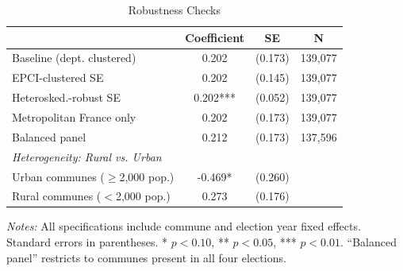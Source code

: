 \begin{table}[H]
\centering
\caption{Robustness Checks}
\label{tab:robust}
\begin{threeparttable}
\begin{tabular}{lccc}
\toprule
 & Coefficient & SE & N \\
\midrule
Baseline (dept. clustered) & 0.202 & (0.173) & 139,077 \\
EPCI-clustered SE & 0.202 & (0.145) & 139,077 \\
Heterosked.-robust SE & 0.202*** & (0.052) & 139,077 \\
Metropolitan France only & 0.202 & (0.173) & 139,077 \\
Balanced panel & 0.212 & (0.173) & 137,596 \\
\midrule
\multicolumn{4}{l}{\textit{Heterogeneity: Rural vs. Urban}} \\
Urban communes ($\geq$2,000 pop.) & -0.469* & (0.260) & \\
Rural communes ($<$2,000 pop.) & 0.273 & (0.176) & \\
\bottomrule
\end{tabular}
\begin{tablenotes}[flushleft]
\small
\item \textit{Notes:} All specifications include commune and election year fixed effects.  Standard errors in parentheses. * $p<0.10$, ** $p<0.05$, *** $p<0.01$.  ``Balanced panel'' restricts to communes present in all four elections.
\end{tablenotes}
\end{threeparttable}
\end{table}
